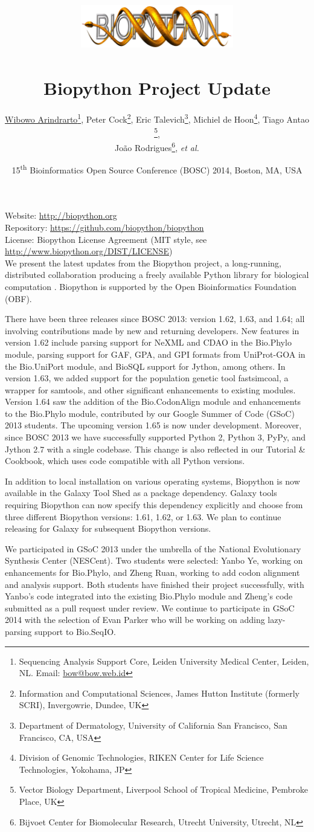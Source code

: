 \documentclass[10pt,oneside]{article}
\title{%
\vspace{-1.5in}
\includegraphics[width=0.5\textwidth]{biopython.jpg}\\
~\\Biopython Project Update}
\author{
    \underline{Wibowo Arindrarto}\footnote{Sequencing Analysis Support Core, Leiden University Medical Center, Leiden, NL. Email: \href{mailto:bow@bow.web.id}{bow@bow.web.id}},
    Peter Cock\footnote{Information and Computational Sciences, James Hutton Institute (formerly SCRI), Invergowrie, Dundee, UK},
    Eric Talevich\footnote{Department of Dermatology, University of California San Francisco, San Francisco, CA, USA},
    Michiel de Hoon\footnote{Division of Genomic Technologies, RIKEN Center for Life Science Technologies, Yokohama, JP},
    Tiago Antao \footnote{Vector Biology Department, Liverpool School of Tropical Medicine, Pembroke Place, UK},
    \\
    Jo\~{a}o Rodrigues\footnote{Bijvoet Center for Biomolecular Research, Utrecht University, Utrecht, NL},
    \textit{et al.}}
\date{15\textsuperscript{th} Bioinformatics Open Source Conference (BOSC) 2014, Boston, MA, USA}
\begin{document}
\maketitle
\thispagestyle{empty}

\vspace{-0.2in}
\noindent
Website: \url{http://biopython.org} \\
Repository: \url{https://github.com/biopython/biopython} \\
License: Biopython License Agreement (MIT style, see \url{http://www.biopython.org/DIST/LICENSE}) \\

We present the latest updates from the Biopython project, a long-running,
distributed collaboration producing a freely available Python library for
biological computation \citep{AppNote}. Biopython is supported by the Open
Bioinformatics Foundation (OBF).

There have been three releases since BOSC 2013: version 1.62, 1.63, and 1.64; all
involving contributions made by new and returning developers. New features
in version 1.62 include parsing support for NeXML and CDAO in the Bio.Phylo
module, parsing support for GAF, GPA, and GPI formats from UniProt-GOA
in the Bio.UniPort module, and BioSQL support for Jython, among others.
In version 1.63, we added  support for the population genetic tool
fastsimcoal, a wrapper for samtools, and other significant enhancements to
existing modules. Version 1.64 saw the addition of the Bio.CodonAlign module
and enhancements to the Bio.Phylo module, contributed by our Google Summer
of Code (GSoC) 2013 students. The upcoming version 1.65 is now under development.
Moreover, since BOSC 2013 we have successfully supported Python 2, Python 3,
PyPy, and Jython 2.7 with a single codebase. This change is also reflected in
our Tutorial \& Cookbook, which uses code compatible with all Python versions.

In addition to local installation on various operating systems, Biopython
is now available in the Galaxy Tool Shed \citep{ToolShed} as a package
dependency. Galaxy tools requiring Biopython can now specify this dependency
explicitly and choose from three different Biopython versions: 1.61, 1.62, or
1.63. We plan to continue releasing for Galaxy for subsequent Biopython versions.

We participated in GSoC 2013 under the umbrella of the National Evolutionary
Synthesis Center (NESCent). Two students were selected: Yanbo Ye, working on
enhancements for Bio.Phylo, and Zheng Ruan, working to add codon alignment and
analysis support. Both students have finished their project successfully, with
Yanbo's code integrated into the existing Bio.Phylo module and Zheng's code
submitted as a pull request under review. We continue to participate in GSoC 2014
with the selection of Evan Parker who will be working on adding lazy-parsing
support to Bio.SeqIO.
\end{document}

